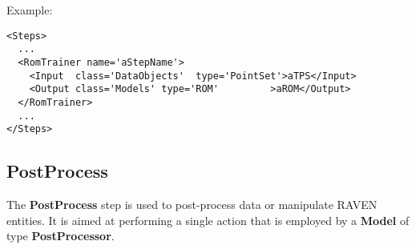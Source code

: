 Example:
\begin{lstlisting}[style=XML,morekeywords={class}]
<Steps>
  ...
  <RomTrainer name='aStepName'>
    <Input  class='DataObjects'  type='PointSet'>aTPS</Input>
    <Output class='Models' type='ROM'         >aROM</Output>
  </RomTrainer>
  ...
</Steps>
\end{lstlisting}
\subsection{PostProcess}
\label{subsec:stepPostProcess}
The \textbf{PostProcess} step is used to post-process data or manipulate RAVEN
entities.
%
It is aimed at performing a single action that is employed by a
\textbf{Model} of type \textbf{PostProcessor}.
%

